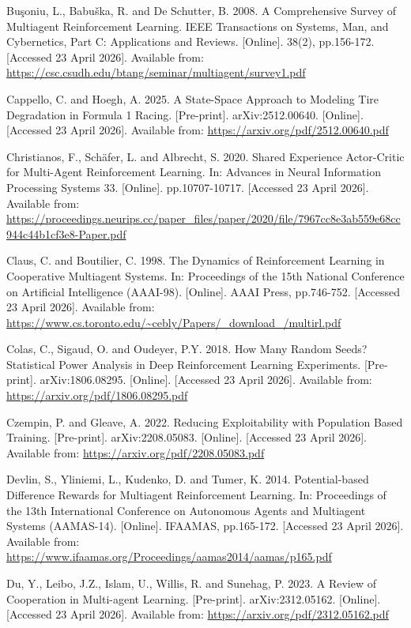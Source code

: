 Bu\c{s}oniu, L., Babu\v{s}ka, R. and De Schutter, B. 2008. A Comprehensive Survey of Multiagent Reinforcement Learning. IEEE Transactions on Systems, Man, and Cybernetics, Part C: Applications and Reviews. [Online]. 38(2), pp.156-172. [Accessed 23 April 2026]. Available from: \url{https://csc.csudh.edu/btang/seminar/multiagent/survey1.pdf}

Cappello, C. and Hoegh, A. 2025. A State-Space Approach to Modeling Tire Degradation in Formula 1 Racing. [Pre-print]. arXiv:2512.00640. [Online]. [Accessed 23 April 2026]. Available from: \url{https://arxiv.org/pdf/2512.00640.pdf}

Christianos, F., Sch{\"a}fer, L. and Albrecht, S. 2020. Shared Experience Actor-Critic for Multi-Agent Reinforcement Learning. In: Advances in Neural Information Processing Systems 33. [Online]. pp.10707-10717. [Accessed 23 April 2026]. Available from: \url{https://proceedings.neurips.cc/paper_files/paper/2020/file/7967cc8e3ab559e68cc944c44b1cf3e8-Paper.pdf}

Claus, C. and Boutilier, C. 1998. The Dynamics of Reinforcement Learning in Cooperative Multiagent Systems. In: Proceedings of the 15th National Conference on Artificial Intelligence (AAAI-98). [Online]. AAAI Press, pp.746-752. [Accessed 23 April 2026]. Available from: \url{https://www.cs.toronto.edu/~cebly/Papers/_download_/multirl.pdf}

Colas, C., Sigaud, O. and Oudeyer, P.Y. 2018. How Many Random Seeds? Statistical Power Analysis in Deep Reinforcement Learning Experiments. [Pre-print]. arXiv:1806.08295. [Online]. [Accessed 23 April 2026]. Available from: \url{https://arxiv.org/pdf/1806.08295.pdf}

Czempin, P. and Gleave, A. 2022. Reducing Exploitability with Population Based Training. [Pre-print]. arXiv:2208.05083. [Online]. [Accessed 23 April 2026]. Available from: \url{https://arxiv.org/pdf/2208.05083.pdf}

Devlin, S., Yliniemi, L., Kudenko, D. and Tumer, K. 2014. Potential-based Difference Rewards for Multiagent Reinforcement Learning. In: Proceedings of the 13th International Conference on Autonomous Agents and Multiagent Systems (AAMAS-14). [Online]. IFAAMAS, pp.165-172. [Accessed 23 April 2026]. Available from: \url{https://www.ifaamas.org/Proceedings/aamas2014/aamas/p165.pdf}

Du, Y., Leibo, J.Z., Islam, U., Willis, R. and Sunehag, P. 2023. A Review of Cooperation in Multi-agent Learning. [Pre-print]. arXiv:2312.05162. [Online]. [Accessed 23 April 2026]. Available from: \url{https://arxiv.org/pdf/2312.05162.pdf}

